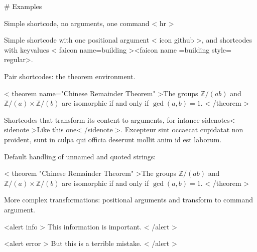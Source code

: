 \documentclass[12pt]{article}
\theoremstyle{TheoremStyle}
\begin{document}
	

\begin{markdown}
    
# Examples
    
    
Simple shortcode, no arguments, one command
{{< hr >}}
    
    
Simple shortcode with one positional argument {{< icon github >}}, and shortcodes with keyvalues {{< faicon name=building  >}}{{<faicon name =building style=   regular>}}.
    
Pair shortcodes: the theorem environment.

{{< theorem name="Chinese Remainder Theorem" >}}The groups $\mathbb{Z}/(ab)$ and $\mathbb{Z}/(a)\times \mathbb{Z}/(b)$ are isomorphic if and only if $\gcd(a,b)=1$.
{{< /theorem >}}

Shortcodes that transform its content to arguments, for intance sidenotes{{< sidenote >}}Like this one{{< /sidenote >}}. Excepteur sint occaecat cupidatat non proident, sunt in culpa qui officia deserunt mollit anim id est laborum. 

Default handling of unnamed and quoted strings:

{{< theorem "Chinese Remainder Theorem" >}}The groups $\mathbb{Z}/(ab)$ and $\mathbb{Z}/(a)\times \mathbb{Z}/(b)$ are isomorphic if and only if $\gcd(a,b)=1$.
{{< /theorem >}}


More complex transformations: positional arguments and transform to command argument.

{{<alert info >}}
This information is important.
{{< /alert >}}


{{<alert error >}}
But this is a terrible mistake.
{{< /alert >}}



\end{markdown}

    

\end{document}
